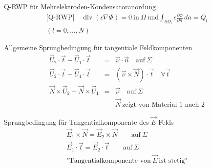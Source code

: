 \documentclass[a6paper]{kartei}
\begin{document}
\begin{karte}{Q-RWP für Mehrelektroden-Kondensatoranordung}
 \begin{eqnarray}
 \text{[Q-RWP]} \quad \operatorname{div}(\epsilon \nabla \Phi) = 0 \ \text{in} \ \Omega
  \ \text{und} \int_{\partial \Omega_{l}} \epsilon \frac{\partial \Phi}{\partial n} \,da = Q_{l} \\
 (l = 0, \dots , N) \nonumber
 \end{eqnarray}

\end{karte}
\begin{karte}{Allgemeine Sprungbedingung für tangentiale Feldkomponenten}
 \begin{eqnarray}
  \vec{U}_{2} \cdot \vec{t}  -   \vec{U}_{1} \cdot \vec{t} & = &  \vec{\nu} \cdot \vec{n} \quad \text{auf} \ \Sigma \\
  \vec{U}_{2} \cdot \vec{t} -  \vec{U}_{1} \cdot \vec{t}  & = & (\vec{\nu} \times \vec{N}) \cdot \vec{t}  \quad \forall \vec{t} \\
  \vec{N} \times \vec{U}_{2}  - \vec{N} \times \vec{U}_{1} & = & \vec{\nu} \quad \text{auf} \ \Sigma \\
  & &\vec{N} \ \text{zeigt von Material 1 nach 2} \nonumber
 \end{eqnarray}
\end{karte}

\begin{karte}{Sprungbedingung für Tangentialkomponente des $\vec{E}$-Felds}
\begin{eqnarray}
 \vec{E}_{1} \times \vec{N}  =  \vec{E}_{2} \times \vec{N} \qquad  \text{auf} \ \Sigma \\
 \vec{E}_{1} \cdot \vec{t}  =  \vec{E}_{2} \cdot \vec{t} \qquad \text{auf} \ \Sigma \nonumber \\
 \text{"Tangentialkomponente von} \ \vec{E} \ \text{ist stetig"} \nonumber
\end{eqnarray}
\end{karte}
\end{document}
